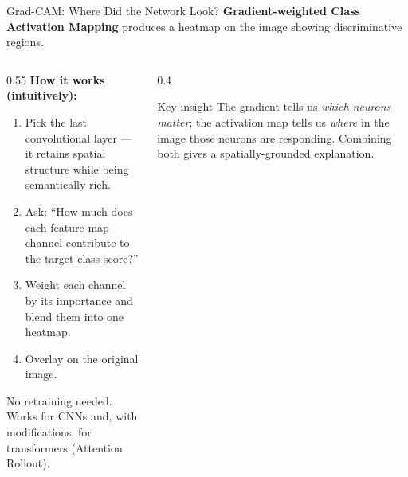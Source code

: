 \documentclass[aspectratio=169]{beamer}
\begin{document}
\begin{frame}{Grad-CAM: Where Did the Network Look?}
  \textbf{Gradient-weighted Class Activation Mapping} produces a
  \alert{heatmap} on the image showing discriminative regions.

  \vspace{0.6em}
  \begin{columns}[T]
    \begin{column}{0.55\textwidth}
      \textbf{How it works (intuitively):}
      \begin{enumerate}
        \item Pick the last convolutional layer — it retains spatial structure
              while being semantically rich.
        \item Ask: ``How much does each feature map channel contribute to
              the target class score?''
        \item Weight each channel by its importance and blend them into
              one heatmap.
        \item Overlay on the original image.
      \end{enumerate}

      \vspace{0.4em}
      \small No retraining needed. Works for CNNs and,
      with modifications, for transformers (Attention Rollout).
    \end{column}
    \begin{column}{0.4\textwidth}
      \begin{block}{Key insight}
        The gradient tells us \emph{which neurons matter};
        the activation map tells us \emph{where} in the image
        those neurons are responding.
        Combining both gives a spatially-grounded explanation.
      \end{block}
    \end{column}
  \end{columns}
\end{frame}
\end{document}
